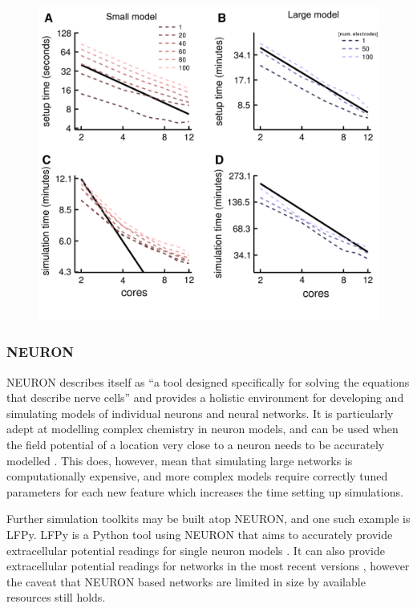 \begin{figure}[h!]
    \centering
    \includegraphics{figures/graphs/coresVERTEX.png}
     {\small{\cite{tomsett_virtual_2015}}}
    \label{VERTEXparallel}
\end{figure}
\vspace{1ex}

\subsubsection{NEURON}

NEURON describes itself as ``a tool designed specifically for solving the
equations that describe nerve cells'' and provides a holistic environment for
developing and simulating models of individual neurons and neural networks. It
is particularly adept at modelling complex chemistry in neuron models, and can
be used when the field potential of a location very close to a neuron needs to
be accurately modelled \autocite{carnevale_neuron_2006}. This does, however,
mean that simulating large networks is computationally expensive, and more
complex models require correctly tuned parameters for each new feature which
increases the time setting up simulations.

Further simulation toolkits may be built atop NEURON, and one such example is
LFPy. LFPy is a Python tool using NEURON that aims to accurately provide
extracellular potential readings for single neuron models
\autocite{hagen_hybrid_2016}. It can also provide extracellular potential
readings for networks in the most recent versions \autocite{hagen_lfpy_2019},
however the caveat that NEURON based networks are limited in size by available
resources still holds.

